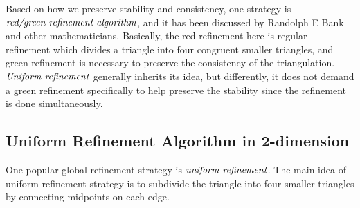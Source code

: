 Based on how we preserve stability and consistency, one strategy is $\emph{red/green refinement algorithm}$, and it has been discussed by Randolph E Bank and other mathematicians\cite{bank1983some,Bey1995,zhang1995successive}. Basically, the red refinement here is regular refinement which divides a triangle into four congruent smaller triangles, and green refinement is necessary to preserve the consistency of the triangulation. $\emph{Uniform refinement}$ generally inherits its idea, but differently, it does not demand a green refinement specifically to help preserve the stability since the refinement is done simultaneously.
    
    \subsection{Uniform Refinement Algorithm in 2-dimension}
    One popular global refinement strategy is $\emph{uniform refinement}$. The main idea of uniform refinement strategy is to subdivide the triangle into four smaller triangles by connecting midpoints on each edge.

